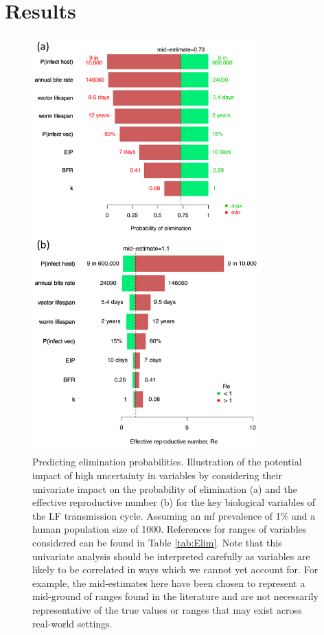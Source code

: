 \section[Results]{Results}

\begin{figure}
    \centering
    \includegraphics[height=16cm]{Project/Figures/LFElimination/Figure4.pdf}
    \caption{Predicting elimination probabilities. Illustration of the potential impact of high uncertainty in variables by considering their univariate impact on the probability of elimination (a) and the effective reproductive number (b) for the key biological variables of the LF transmission cycle. Assuming an mf prevalence of 1\% and a human population size of 1000. References for ranges of variables considered can be found in Table \ref{tab:Elim}. Note that this univariate analysis should be interpreted carefully as variables are likely to be correlated in ways which we cannot yet account for. For example, the mid-estimates here have been chosen to represent a mid-ground of ranges found in the literature and are not necessarily representative of the true values or ranges that may exist across real-world settings.}
    \label{fig:Elim_4}
\end{figure}


